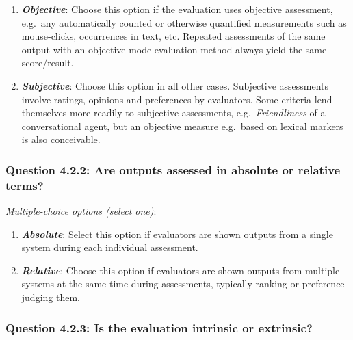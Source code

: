 \documentclass[11pt,a4paper]{article}
\newcommand{\egcvalue}[1]{\textbf{\textit{#1}}}
\begin{document}
\begin{enumerate}[itemsep=0cm,leftmargin=0.5cm,label={\LARGE $\circ$}]
    \item \egcvalue{Objective}: Choose this option if the evaluation uses objective assessment, e.g.\ any automatically counted or otherwise quantified measurements such as mouse-clicks, occurrences in text, etc. Repeated assessments of the same output with an objective-mode evaluation method always yield the same score/result.
    \item \egcvalue{Subjective}: Choose this option in all other cases. Subjective assessments involve ratings, opinions and preferences by evaluators. Some criteria lend themselves more readily to subjective assessments, e.g.\ \textit{Friendliness} of a conversational agent, but an objective measure e.g.\ based on lexical markers is also conceivable.
\end{enumerate}
    
\subsubsection*{Question 4.2.2: Are outputs assessed in absolute or relative terms?}
\vspace{-.1cm}

\vspace{.3cm}
\noindent\textit{Multiple-choice options (select one)}:  
\vspace{-.1cm}

\begin{enumerate}[itemsep=0cm,leftmargin=0.5cm,label={\LARGE $\circ$}]
    \item \egcvalue{Absolute}: Select this option if evaluators are shown outputs from a single system during each individual assessment.
    \item \egcvalue{Relative}: Choose this option if evaluators are shown outputs from multiple systems at the same time during assessments, typically ranking or preference-judging them.
\end{enumerate}

\vspace{-.3cm}
\subsubsection*{Question 4.2.3: Is the evaluation intrinsic or extrinsic?}
\end{document}
